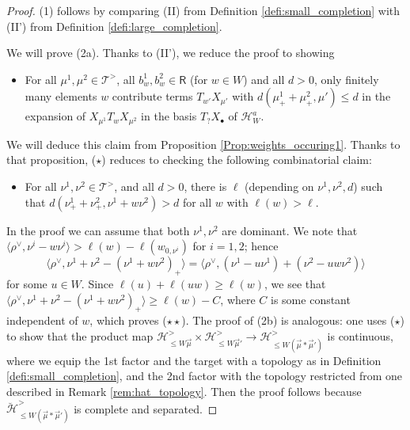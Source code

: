 \documentclass{amsart}
\newcommand{\Hecke}{\mathcal{H}}
\newcommand{\Ring}{\mathsf{R}}
\theoremstyle{definition}
\numberwithin{equation}{section}
\begin{document}
\begin{proof}
(1) follows by comparing (II) from Definition \ref{defi:small_completion} with (II') from Definition \ref{defi:large_completion}.

We will prove (2a).
Thanks to (II'), we reduce the proof to showing
\begin{itemize}
\item[($\star$)] For all $\mu^1,\mu^2\in \mathcal{T}^>$, all $b^1_w,b^2_w\in \Ring$ (for $w\in W$) and all $d>0$,  only finitely many elements $w$ contribute terms $T_{w'}X_{\mu'}$ with $d(\mu^1_++\mu^2_+,\mu')\leqslant d$ in the expansion of $X_{\mu^1}T_wX_{\mu^2}$ in the basis $T_?X_\bullet$ of $\Hecke^a_W$.
\end{itemize}
We will deduce this claim from Proposition \ref{Prop:weights_occuring1}. Thanks to that proposition, ($\star$) reduces to checking the following combinatorial claim:
\begin{itemize}
\item[($\star \star$)] For all $\nu^1,\nu^2\in \mathcal{T}^>$, and all $d>0$, there is $\ell$ (depending on $\nu^1,\nu^2,d$) such that $d(\nu^1_++\nu^2_+, \nu^1+w\nu^2)>d$ for all $w$ with $\ell(w)>\ell$.
\end{itemize}
In the proof we can assume that both $\nu^1,\nu^2$ are dominant. We note that $\langle\rho^\vee, \nu^i-w\nu^i\rangle> \ell(w)-\ell(w_{0,\nu^i})$
for $i=1,2$; hence
$$\langle\rho^\vee,\nu^1+\nu^2-(\nu^1+w\nu^2)_+\rangle=\langle\rho^\vee,(\nu^1-u\nu^1)+ (\nu^2-uw\nu^2)\rangle$$ for some $u\in W$. Since $\ell(u)+\ell(uw)\geqslant \ell(w)$, we see that $\langle\rho^\vee,\nu^1+\nu^2-(\nu^1+w\nu^2)_+\rangle\geqslant \ell(w)-C$, where $C$ is some constant independent of $w$,
which proves ($\star \star$).
%
The proof of (2b) is analogous: one uses ($\star$) to show that the product map $\Hecke^>_{\leqslant W\vec{\mu}}\times \Hecke^>_{\leqslant W\vec{\mu}'}\rightarrow \Hecke^>_{\leqslant W(\vec{\mu}*\vec{\mu}')}$ is continuous, where we equip the 1st factor and the target with a topology as in Definition \ref{defi:small_completion}, and the 2nd factor with the topology restricted from one described in
Remark \ref{rem:hat_topology}. Then the proof follows because $\breve{\mathcal{H}}^>_{\leqslant W(\vec{\mu}*\vec{\mu}')}$ is complete and separated.
\end{proof}
\end{document}
